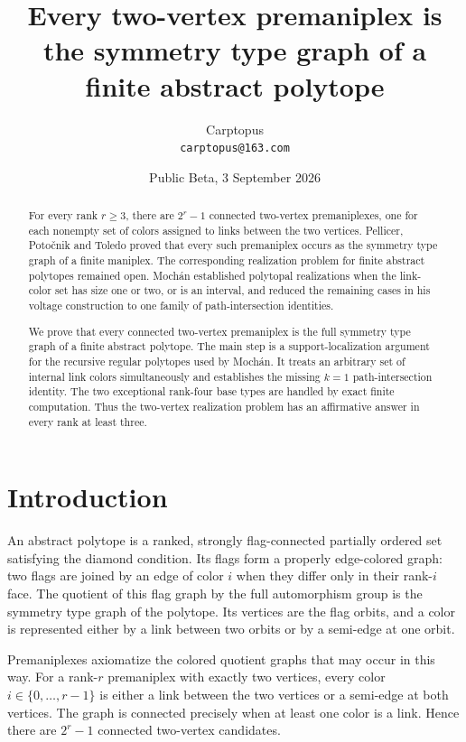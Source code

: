 \documentclass[11pt]{article}
\title{Every two-vertex premaniplex is the symmetry type graph of a finite abstract polytope}
\author{Carptopus\\\small\texttt{carptopus@163.com}}
\date{Public Beta, 3 September 2026}
\begin{document}
\maketitle
\begin{abstract}

For every rank $r\geq 3$, there are $2^r-1$ connected two-vertex premaniplexes, one for each
nonempty set of colors assigned to links between the two vertices. Pellicer, Poto\v{c}nik and Toledo
proved that every such premaniplex occurs as the symmetry type graph of a finite maniplex. The
corresponding realization problem for finite abstract polytopes remained open. Mochán established
polytopal realizations when the link-color set has size one or two, or is an interval, and reduced
the remaining cases in his voltage construction to one family of path-intersection identities.

We prove that every connected two-vertex premaniplex is the full symmetry type graph of a finite
abstract polytope. The main step is a support-localization argument for the recursive regular
polytopes used by Mochán. It treats an arbitrary set of internal link colors simultaneously and
establishes the missing $k=1$ path-intersection identity. The two exceptional rank-four base types
are handled by exact finite computation. Thus the two-vertex realization problem has an affirmative
answer in every rank at least three.

\end{abstract}

\section{Introduction}

An abstract polytope is a ranked, strongly flag-connected partially ordered set satisfying the
diamond condition. Its flags form a properly edge-colored graph: two flags are joined by an edge of
color $i$ when they differ only in their rank-$i$ face. The quotient of this flag graph by the full
automorphism group is the symmetry type graph of the polytope. Its vertices are the flag orbits,
and a color is represented either by a link between two orbits or by a semi-edge at one orbit.

Premaniplexes axiomatize the colored quotient graphs that may occur in this way. For a rank-$r$
premaniplex with exactly two vertices, every color $i\in\{0,\ldots,r-1\}$ is either a link between
the two vertices or a semi-edge at both vertices. The graph is connected precisely when at least
one color is a link. Hence there are $2^r-1$ connected two-vertex candidates.
\end{document}
